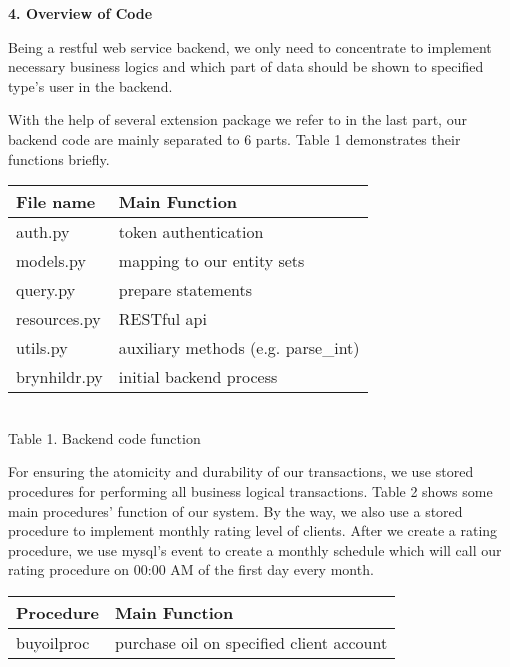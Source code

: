 \documentclass[12pt,a4paper]{report}
\begin{document}
\begin{mypara}
  \textbf{4. Overview of Code}
  \par
  Being a restful web service backend, we only need to concentrate to implement necessary business logics and which part of data should be shown to specified type's user in the backend.
  \par
  With the help of several extension package we refer to in the last part, our backend code are mainly separated to 6 parts. Table 1 demonstrates their functions briefly.
  \par\noindent\ignorespaces
  \begin{center}
    \begin{tabular}{|l|l|}
      \hline
      \textbf{File name} & \textbf{Main Function}\\
      \hline
      auth.py & token authentication\\
      \hline
      models.py & mapping to our entity sets\\
      \hline
      query.py & prepare statements\\
      \hline
      resources.py & RESTful api\\
      \hline
      utils.py & auxiliary methods (e.g. parse\_int)\\
      \hline
      brynhildr.py & initial backend process\\
      \hline
    \end{tabular}\\
    \vspace{0.2cm}
    Table 1. Backend code function
  \end{center}
  \par
  For ensuring the atomicity and durability of our transactions, we use stored procedures for performing all business logical transactions. Table 2 shows some main procedures' function of our system. By the way, we also use a stored procedure to implement monthly rating level of clients. After we create a rating procedure, we use mysql's event to create a monthly schedule which will call our rating procedure on 00:00 AM of the first day every month.
  \par\noindent\ignorespaces
  \begin{center}
    \begin{tabular}{|l|l|}
      \hline
      \textbf{Procedure} & \textbf{Main Function}\\
      \hline
      buyoilproc & purchase oil on specified client account\\
      \hline

\end{tabular}
\end{center}
\end{mypara}
\end{document}
